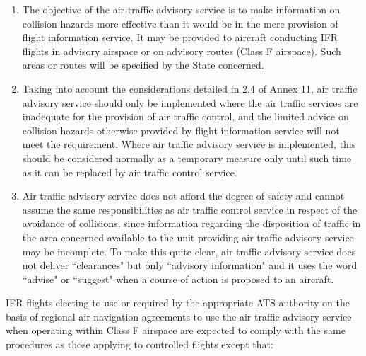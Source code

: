 \begin{enumeratesc}
    \begin{enumerate}
        \item The objective of the air traffic advisory service is to make information on collision hazards more effective than it would be in the mere provision of flight information service. It may be provided to aircraft conducting IFR flights in advisory airspace or on advisory routes (Class F airspace). Such areas or routes will be specified by the State concerned.
        \item Taking into account the considerations detailed in 2.4 of Annex 11, air traffic advisory service should only be implemented where the air traffic services are inadequate for the provision of air traffic control, and the limited advice on collision hazards otherwise provided by flight information service will not meet the requirement. Where air traffic advisory service is implemented, this should be considered normally as a temporary measure only until such time as it can be replaced by air traffic control service.
        \item Air traffic advisory service does not afford the degree of safety and cannot assume the same responsibilities as air traffic control service in respect of the avoidance of collisions, since information regarding the disposition of traffic in the area concerned available to the unit providing air traffic advisory service may be incomplete. To make this quite clear, air traffic advisory service does not deliver ``clearances" but only ``advisory information" and it uses the word ``advise" or ``suggest" when a course of action is proposed to an aircraft.
    \end{enumerate}

    \begin{enumeratescit}
         \label{9.1.4.2.1}
        
        \noindent IFR flights electing to use or required by the appropriate ATS authority on the basis of regional air navigation agreements to use the air traffic advisory service when operating within Class F airspace are expected to comply with the same procedures as those applying to controlled flights except that:


\end{enumeratescit}
\end{enumeratesc}

